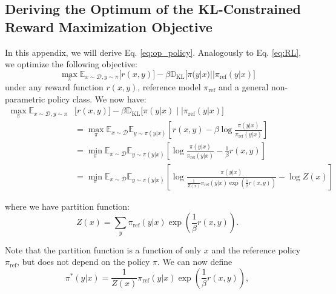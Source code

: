 \documentclass{article}
\begin{document}
\subsection{Deriving the Optimum of the KL-Constrained Reward Maximization Objective}
In this appendix, we will derive Eq. \ref{eq:op_policy}. Analogously to Eq. \ref{eq:RL}, we optimize the following objective:
\begin{equation}
\max_{\pi}  \mathbb{E}_{x\sim \mathcal{D}, y\sim \pi}\bigl[r(x, y)\bigr] - \beta\mathbb{D}_{\textrm{KL}}\bigl[\pi(y|x)||\pi_\text{ref}(y|x)\bigr]
\end{equation}
under any reward function $r(x,y)$, reference model $\pi_\text{ref}$ and a general non-parametric policy class. We now have:
\begin{align}\label{eq:RL_proof}
\max_{\pi}  \mathbb{E}_{x\sim \mathcal{D}, y\sim \pi}&\bigl[r(x, y)\bigr] - \beta\mathbb{D}_{\textrm{KL}}\bigl[\pi(y|x)\mid\mid\pi_\text{ref}(y|x)\bigr] \nonumber\\
&=\max_{\pi}  \mathbb{E}_{x\sim \mathcal{D}}\mathbb{E}_{y\sim \pi(y|x)}\left[r(x, y) - \beta\log\frac{\pi(y|x)}{\pi_\text{ref}(y|x)}\right] \nonumber\\&=
\min_{\pi}  \mathbb{E}_{x\sim \mathcal{D}}\mathbb{E}_{y\sim \pi(y|x)}\left[\log\frac{\pi(y|x)}{\pi_\text{ref}(y|x)} - \frac{1}{\beta}r(x, y)\right] \nonumber\\ &=
\min_{\pi}  \mathbb{E}_{x\sim \mathcal{D}}\mathbb{E}_{y\sim \pi(y|x)}\left[\log\frac{\pi(y|x)}{\frac{1}{Z(x)}\pi_\text{ref}(y|x)\exp\left(\frac{1}{\beta}r(x, y)\right)} - \log Z(x)\right]
\end{align}

where we have partition function:
\begin{equation*}
Z(x) = \sum_{y}\pi_\text{ref}(y|x)\exp\left(\frac{1}{\beta}r(x, y)\right).
\end{equation*}

Note that the partition function is a function of only $x$ and the reference policy $\pi_\text{ref}$, but does not depend on the policy $\pi$. We can now define
\begin{equation*}
    \pi^*(y|x) = \frac{1}{Z(x)}\pi_\text{ref}(y|x)\exp\left(\frac{1}{\beta}r(x, y)\right),
\end{equation*}
\end{document}
